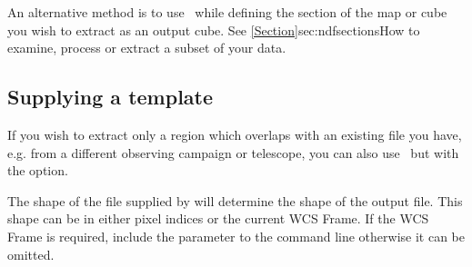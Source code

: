 \documentclass[11pt,oneside,chapters]{starlink}
\begin{document}
An alternative method is to use \ndfcopy\ while defining the section
of the map or cube you wish to extract as an output cube. See
\cref{Section}{sec:ndfsections}{How to examine, process or extract a
subset of your data}.

\subsection{Supplying a template}

If you wish to extract only a region which overlaps with an existing
file you have, e.g. from a different observing campaign or telescope,
you can also use \ndfcopy\ but with the  option.
\begin{terminalv}
\end{terminalv}
The shape of the file supplied by  will determine the
shape of the output file. This shape can be in either pixel indices or
the current WCS Frame. If the WCS Frame is required, include the
parameter  to the command line otherwise it can be
omitted.
\end{document}
